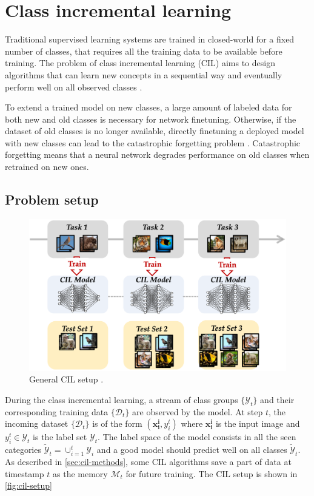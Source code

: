 \section{Class incremental learning}
Traditional supervised learning systems are trained in closed-world for a fixed
number of classes, that requires all the training data to be available before training.
The problem of class incremental learning (CIL) aims to design algorithms that can learn new concepts in a sequential way and eventually perform well on all observed classes \cite{yan2021dynamically}.

To extend a trained model on new classes, a large amount of labeled data for both new
and old classes is necessary for network finetuning. Otherwise, if the dataset of old classes is no
longer available, directly finetuning a deployed model with
new classes can lead to the catastrophic forgetting
problem \cite{serra2018overcoming, zhang2021few, mccloskey1989catastrophic}. Catastrophic forgetting means that a neural network degrades performance on old classes when retrained on new ones.

\subsection{Problem setup}


\begin{figure}
    \begin{center}
        \includegraphics[width=0.9\columnwidth]{images/cil-setup.png}
    \end{center}
    \caption{General CIL setup \cite{zhou2021pycil}.}
    \label{fig:cil-setup}
\end{figure}

During the class incremental learning, a stream of class groups $\{\mathcal{Y}_t\}$ and their corresponding training data $\{\mathcal{D}_t\}$ are observed by the model. At step $t$, the incoming dataset $\{\mathcal{D}_t\}$ is of the form $(\textbf{x}_{\textbf{i}}^{\textbf{i}}, y_i^t)$ where $\textbf{x}_{\textbf{i}}^{\textbf{i}}$ is the input image and $y_i^t \in \mathcal{Y}_t$ is the label set $\mathcal{Y}_t$. The label space of the model consists in all the seen categories $\tilde{\mathcal{Y}}_t = \cup_{i=1}^t \mathcal{Y}_i$ and a good model should predict well on all classes $\tilde{\mathcal{Y}}_t$. As described in \autoref{sec:cil-methods}, some CIL algorithms save a part of data at timestamp $t$ as the memory $\mathcal{M}_t$ for future training. The CIL setup is shown in \autoref{fig:cil-setup}

